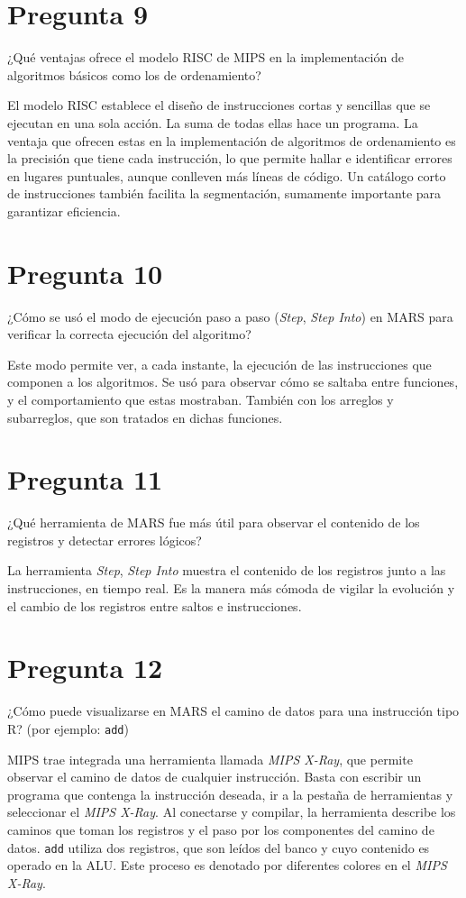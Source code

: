 \documentclass[12pt]{article}
\begin{document}
\section*{Pregunta 9}
¿Qué ventajas ofrece el modelo RISC de MIPS en la implementación de algoritmos básicos como los de ordenamiento?

El modelo RISC establece el diseño de instrucciones cortas y sencillas que se ejecutan en una sola acción. La suma de todas ellas hace un programa. La ventaja que ofrecen estas en la implementación de algoritmos de ordenamiento es la precisión que tiene cada instrucción, lo que permite hallar e identificar errores en lugares puntuales, aunque conlleven más líneas de código. Un catálogo corto de instrucciones también facilita la segmentación, sumamente importante para garantizar eficiencia.

\section*{Pregunta 10}
¿Cómo se usó el modo de ejecución paso a paso (\textit{Step}, \textit{Step Into}) en MARS para verificar la correcta ejecución del algoritmo?

Este modo permite ver, a cada instante, la ejecución de las instrucciones que componen a los algoritmos. Se usó para observar cómo se saltaba entre funciones, y el comportamiento que estas mostraban. También con los arreglos y subarreglos, que son tratados en dichas funciones.

\section*{Pregunta 11}
¿Qué herramienta de MARS fue más útil para observar el contenido de los registros y detectar errores lógicos?

La herramienta \textit{Step}, \textit{Step Into} muestra el contenido de los registros junto a las instrucciones, en tiempo real. Es la manera más cómoda de vigilar la evolución y el cambio de los registros entre saltos e instrucciones.

\section*{Pregunta 12}
¿Cómo puede visualizarse en MARS el camino de datos para una instrucción tipo R? (por ejemplo: \texttt{add})

MIPS trae integrada una herramienta llamada \textit{MIPS X-Ray}, que permite observar el camino de datos de cualquier instrucción. Basta con escribir un programa que contenga la instrucción deseada, ir a la pestaña de herramientas y seleccionar el \textit{MIPS X-Ray}. Al conectarse y compilar, la herramienta describe los caminos que toman los registros y el paso por los componentes del camino de datos. \texttt{add} utiliza dos registros, que son leídos del banco y cuyo contenido es operado en la ALU. Este proceso es denotado por diferentes colores en el \textit{MIPS X-Ray}.
\end{document}
